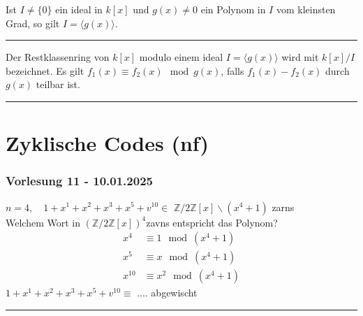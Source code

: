 \documentclass[9pt]{article}
\begin{document}
\begin{satz}
Ist $I \neq \{0\}$ ein \Gls{ideal} in $k[x]$ und $g(x) \neq 0$ ein \gls{Polynom} in $I$ vom kleinsten Grad, so gilt $I = \langle g(x) \rangle$.  
 \end{satz} \noindent \rule{8cm}{0.4pt}

\begin{defi}
Der Restklassenring von $k[x]$ modulo einem \Gls{ideal} $I = \langle g(x) \rangle$ wird mit $k[x]/I$ bezeichnet. Es gilt $f_1(x) \equiv f_2(x) \mod g(x)$, falls $f_1(x) - f_2(x)$ durch $g(x)$ teilbar ist.  
\end{defi} \noindent \rule{8cm}{0.4pt} 


\section{Zyklische Codes (nf)}
\subsubsection*{Vorlesung 11 - 10.01.2025}

\begin{bsp} 
$n = 4, \quad 1 + x^1+x^2 + x^3+x^5+v^{10} \in$ $\mathbb{Z} / 2 \mathbb{Z}[x]\backslash (x^4 + 1)$ \glspl{zarn} \\
Welchem Wort in $(\mathbb{Z} / 2 \mathbb{Z}[x])^4$\glspl{zavn} entspricht das Polynom?  
\begin{align*}
    x^4 & \equiv 1 \mod (x^4+1) \\
    x^5 & \equiv x \mod (x^4+1) \\
    x^10 & \equiv x^2 \mod (x^4+1) 
\end{align*}
$1 + x^1+x^2 + x^3+x^5+v^{10} \equiv $
.... abgewischt 
\end{bsp} \noindent \rule{8cm}{0.4pt}
\end{document}

